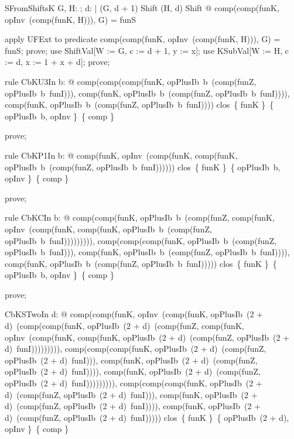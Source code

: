 \documentclass{article}
\begin{document}
\begin{theorem}{SFromShiftsK}
  \forall G, H: \nat \fun \nat; d: \nat | (G, d + 1) \in Shift \land (H, d) \in Shift @ comp(comp(funK, opInv~(comp(funK, H))), G) = funS
\end{theorem}

\begin{zproof}
apply UFExt to predicate comp(comp(funK, opInv~(comp(funK, H))), G) = funS;
prove;
use ShiftVal[W := G, c := d + 1, y := x];
use KSubVal[W := H, c := d, x := 1 + x + d];
prove;
\end{zproof}

\begin{theorem}{rule CbKU3In}
  \forall b: \nat @ comp(comp(comp(funK, opPlusIb~b~(comp(funZ, opPlusIb~b~funI))), comp(funK, opPlusIb~b~(comp(funZ, opPlusIb~b~funI)))), comp(funK, opPlusIb~b~(comp(funZ, opPlusIb~b~funI)))) \in clos~\{ funK \}~\{ opPlusIb~b, opInv \}~\{ comp \}
\end{theorem}

\begin{zproof}
prove;
\end{zproof}

\begin{theorem}{rule CbKP1In}
  \forall b: \nat @ comp(funK, opInv~(comp(funK, comp(funK, opPlusIb~b~(comp(funZ, opPlusIb~b~funI)))))) \in clos~\{ funK \}~\{ opPlusIb~b, opInv \}~\{ comp \}
\end{theorem}

\begin{zproof}
prove;
\end{zproof}

\begin{theorem}{rule CbKCIn}
  \forall b: \nat @ comp(comp(funK, opPlusIb~b~(comp(funZ, comp(funK, opInv~(comp(funK, comp(funK, opPlusIb~b~(comp(funZ, opPlusIb~b~funI))))))))), comp(comp(comp(funK, opPlusIb~b~(comp(funZ, opPlusIb~b~funI))), comp(funK, opPlusIb~b~(comp(funZ, opPlusIb~b~funI)))), comp(funK, opPlusIb~b~(comp(funZ, opPlusIb~b~funI))))) \in clos~\{ funK \}~\{ opPlusIb~b, opInv \}~\{ comp \}
\end{theorem}

\begin{zproof}
prove;
\end{zproof}

\begin{theorem}{CbKSTwoIn}
  \forall d: \nat @ comp(comp(funK, opInv~(comp(funK, opPlusIb~(2 + d)~(comp(comp(funK, opPlusIb~(2 + d)~(comp(funZ, comp(funK, opInv~(comp(funK, comp(funK, opPlusIb~(2 + d)~(comp(funZ, opPlusIb~(2 + d)~funI))))))))), comp(comp(comp(funK, opPlusIb~(2 + d)~(comp(funZ, opPlusIb~(2 + d)~funI))), comp(funK, opPlusIb~(2 + d)~(comp(funZ, opPlusIb~(2 + d)~funI)))), comp(funK, opPlusIb~(2 + d)~(comp(funZ, opPlusIb~(2 + d)~funI))))))))), comp(comp(comp(funK, opPlusIb~(2 + d)~(comp(funZ, opPlusIb~(2 + d)~funI))), comp(funK, opPlusIb~(2 + d)~(comp(funZ, opPlusIb~(2 + d)~funI)))), comp(funK, opPlusIb~(2 + d)~(comp(funZ, opPlusIb~(2 + d)~funI))))) \in clos~\{ funK \}~\{ opPlusIb~(2 + d), opInv \}~\{ comp \}
\end{theorem}
\end{document}
